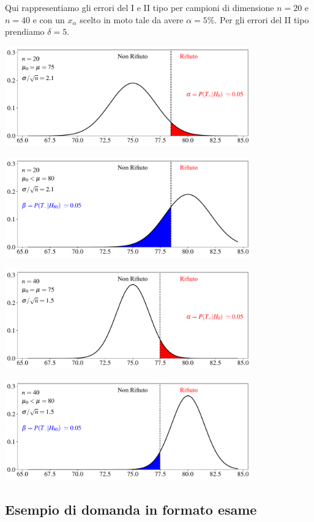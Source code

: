 \documentclass[12pt,openany]{book}
\theoremstyle{mio}
\theoremstyle{liscio}
\begin{document}
Qui rappresentiamo gli errori del I e II tipo per campioni di dimensione $n=20$ e $n= 40$ e con un $x_\alpha$ scelto in moto tale da avere $\alpha=5\%$. Per gli errori del II tipo prendiamo $\delta=5$.

\hfil\includegraphics[width=0.8\textwidth]{figure/Z-test_01.pdf}

\hfil\includegraphics[width=0.8\textwidth]{figure/Z-test_02.pdf}

\hfil\includegraphics[width=0.8\textwidth]{figure/Z-test_03.pdf}

\hfil\includegraphics[width=0.8\textwidth]{figure/Z-test_04.pdf}



\hfill{}\clearpage\subsection{Esempio di domanda in formato esame}
\end{document}
